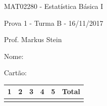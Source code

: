 \documentclass[a4paper,11pt]{article}
\theoremstyle{definition}
\begin{document}
\renewcommand{\thefigure}{{\hspace{-.cm}{\arabic{figure}}}}
 \setcounter{figure}{0}


\begin{center}{\sc \large MAT02280 - Estatística Básica I}\end{center}
\begin{center}{\sc Prova 1 - Turma B - 16/11/2017}\end{center}
\begin{flushright}{\sc Prof. Markus Stein}\end{flushright}

\begin{multicols}{2} 
Nome:

Cartão:

\vspace{2mm}
\begin{flushright}
\begin{tabular}{|c|c|c|c|c|c|}
  \hline
   \hspace{6mm}1\hspace{6mm}& \hspace{6mm}2\hspace{6mm}&\hspace{6mm}3\hspace{6mm}&\hspace{6mm}4\hspace{6mm}&\hspace{6mm}5\hspace{6mm}&Total \\
   \hline
   &  &  & & &   \\
  \hline
\end{tabular}
\end{flushright}
\end{multicols}
\end{document}

